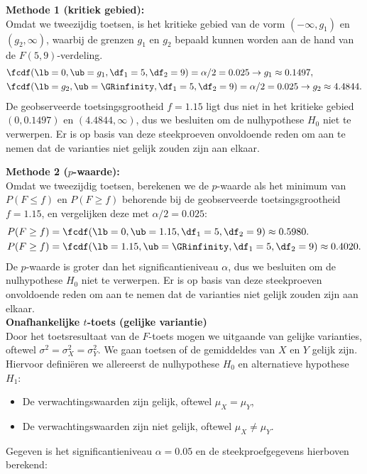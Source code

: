 {    {\noindent\bfseries Methode 1 (kritiek gebied):} \\
    Omdat we tweezijdig toetsen, is het kritieke gebied van de vorm $(-\infty, g_1)$ en $(g_2, \infty)$, waarbij de grenzen $g_1$ en $g_2$ bepaald 
    kunnen worden aan de hand van de $F(5, 9)$-verdeling.
    \begin{align*}
        &\fcdf(\lb=0, \ub=g_1, \df_1=5, \df_2=9)=\alpha/2=0.025 \rightarrow g_1 \approx 0.1497,\\
        &\fcdf(\lb=g_2, \ub=\GRinfinity, \df_1=5, \df_2=9)=\alpha/2=0.025 \rightarrow g_2 \approx 4.4844.
    \end{align*}
    De geobserveerde toetsingsgrootheid $f = 1.15$ ligt dus niet in het kritieke gebied $(0, 0.1497)$ en $(4.4844, \infty)$, dus we besluiten om de nulhypothese $H_0$ niet te verwerpen.
    Er is op basis van deze steekproeven onvoldoende reden om aan te nemen dat de varianties niet gelijk zouden zijn aan elkaar.\\
    \medskip
    
    {\noindent\bfseries Methode 2 ($p$-waarde):} \\
    Omdat we tweezijdig toetsen, berekenen we de $p$-waarde als het minimum van $P(F \leq f)$ en $P(F \geq f)$ behorende bij de 
    geobserveerde toetsingsgrootheid $f = 1.15$, en vergelijken deze met $\alpha/2=0.025$:
    \begin{align*}
        P(F \geq f) &= \fcdf(\lb=0, \ub=1.15, \df_1=5, \df_2=9) \approx 0.5980.\\
        P(F \geq f) &= \fcdf(\lb=1.15, \ub=\GRinfinity, \df_1=5, \df_2=9) \approx 0.4020.
    \end{align*}
    De $p$-waarde is groter dan het significantieniveau $\alpha$, dus we besluiten om de nulhypothese $H_0$ niet te verwerpen.
    Er is op basis van deze steekproeven onvoldoende reden om aan te nemen dat de varianties niet gelijk zouden zijn aan elkaar.\\[1ex]

    {\noindent\bfseries Onafhankelijke \boldmath$t$-toets (gelijke variantie)}\\
    Door het toetsresultaat van de $F$-toets mogen we uitgaande van gelijke varianties, oftewel $\sigma^2 = \sigma_X^2 = \sigma_Y^2$.
    We gaan toetsen of de gemiddeldes van $X$ en $Y$ gelijk zijn.
    Hiervoor defini\"eren we allereerst de nulhypothese $H_0$ en alternatieve hypothese $H_1$:
    \begin{itemize}
        \item[$H_0$:] De verwachtingswaarden zijn gelijk, oftewel $\mu_X = \mu_Y$,
        \item[$H_1$:] De verwachtingswaarden zijn niet gelijk, oftewel $\mu_X \neq \mu_Y$.
    \end{itemize}
    Gegeven is het significantieniveau $\alpha = 0.05$ en de steekproefgegevens hierboven berekend:

}
